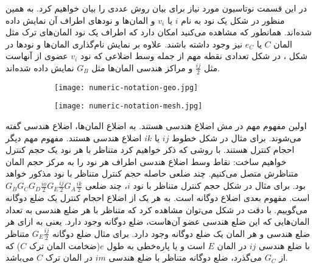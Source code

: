 در این قسمت نوتاسیون مورد نیاز برای بیان روش عددی را بیان خواهیم کرد. به همین منظور در شکل  یک نود به نام $i$ یا $v_i$ و المان‌ها و نود‌های اطراف آن نمایش داده شده‌اند. همانطور که مشاهده می‌کنید امکان دارد که اطراف یک نود المان‌های ترک مثل المان $C$ یا $e_C$ نیز وجود داشته باشند. علاوه بر نمایش نام‌گذاری المان‌ها و نود‌ها در شکل ، در شکل  تعدادی نقطه مهم از جمله وسط اضلاعی که نود $v_i$ عضوی از آنهاست مثل $\frac{ij}{2}$ و مراکز هندسی المان‌ها مثل $G_B$ نمایش داده شده‌اند. 

\begin{figure}
\begin{subfigure}{0.5\textwidth}
\texttt{[image: numeric-notation-geo.jpg]} 
\label{fig:3not-geo}
\end{subfigure}
\begin{subfigure}{0.5\textwidth}
\texttt{[image: numeric-notation-mesh.jpg]} 
\label{fig:3not-mesh}
\end{subfigure}

\label{fig:3not}
\end{figure}

اولین مفهوم مهم در مش اضلاع هندسی هستند. به اضلاع المان‌ها، اضلاع هندسی گفته می‌شوند. برای مثال در شکل  خطوط $ij$ یا $ik$ اضلاع هندسی هستند. مفهوم مهم دیگر احجام کنترل هستند. با روشی که ذکر خواهیم کرد متناظر با هر نود یک حجم کنترل خواهیم ساخت: نقاط وسط اضلاع هندسی اطراف هر نود را به مرکز حجم المان متناظرش متصل می‌کنیم. چند ضلعی حاصله حجم کنترل متناظر با نود مذکور خواهد بود. برای مثال در شکل  حجم کنترل متناظر با نود $i$، چند ضلعی 
$G_BG_CG_D\frac{io}{2}G_E\frac{ij}{2}G_A\frac{ik}{2}$
است. مفهوم بعدی اضلاع دوگانه است. به هر یک از اضلاع احجام کنترل یک ضلع دوگانه می‌گوییم. با دقت در شکل  می‌توان مشاهده کرد که متناظر با هر ضلع هندسی به تعداد المان‌هایی که این ضلع هندسی عضو آن‌هاست، ضلع دوگانه وجود دارد. یعنی به ازای هر ضلع هندسی و هر المان یک ضلع دوگانه وجود دارد. برای مثال ضلع دوگانه 
$G_E\frac{ij}{2}$
متناظر با ضلع هندسی $ij$ در المان $E$ است و یا  پاره‌خطی به طول $e$(ضخامت المان ترک $C$) که از $G_C$ می‌گذرد، ضلع دوگانه متناظر با ضلع هندسی $im$ در المان ترک $C$ می‌باشد.

